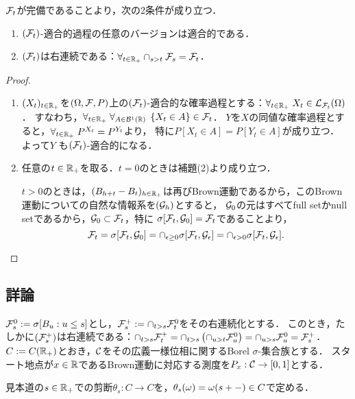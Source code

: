 \documentclass[uplatex,dvipdfmx]{jsreport}
\begin{document}
\begin{lemma}
    $\mathcal{F}_t$が完備であることより，次の2条件が成り立つ．
    \begin{enumerate}
        \item $(\mathcal{F}_t)$-適合的過程の任意のバージョンは適合的である．
        \item $(\mathcal{F}_t)$は右連続である：$\forall_{t\in\mathbb{R}_+}\cap_{s>t}\mathcal{F}_s=\mathcal{F}_t$．
    \end{enumerate}
\end{lemma}
\begin{proof}\mbox{}
    \begin{enumerate}
        \item $(X_t)_{t\in\mathbb{R}_+}$を$(\Omega,\mathcal{F},P)$上の$(\mathcal{F}_t)$-適合的な確率過程とする：$\forall_{t\in\mathbb{R}_+}\;X_t\in\mathcal{L}_{\mathcal{F}_t}(\Omega)$．
        すなわち，$\forall_{t\in\mathbb{R}_+}\;\forall_{A\in\mathcal{B}^1(\mathbb{R})}\;\left\{X_t\in A\right\}\in\mathcal{F}_t$．
        $Y$を$X$の同値な確率過程とすると，$\forall_{t\in\mathbb{R}_+}\;P^{X_t}=P^{Y_t}$より，
        特に$P[X_t\in A]=P[Y_t\in A]$が成り立つ．
        よって$Y$
        も$(\mathcal{F}_t)$-適合的になる．
        \item 
        任意の$t\in\mathbb{R}_+$を取る．$t=0$のときは補題(2)より成り立つ．

        $t>0$のときは，$(B_{h+t}-B_t)_{h\in\mathbb{R}_+}$は再びBrown運動であるから，このBrown運動についての自然な情報系を$(\mathcal{G}_h)$とすると，
        $\mathcal{G}_0$の元はすべてfull setかnull setであるから，$\mathcal{G}_0\subset\mathcal{F}_t$，特に
        $\sigma[\mathcal{F}_t,\mathcal{G}_0]=\mathcal{F}_t$であることより，
        \[\mathcal{F}_t=\sigma[\mathcal{F}_t,\mathcal{G}_0]=\cap_{\epsilon\ge0}\sigma[\mathcal{F}_t,\mathcal{G}_\epsilon]=\cap_{\epsilon>0}\sigma[\mathcal{F}_t,\mathcal{G}_\epsilon].\]
    \end{enumerate}
\end{proof}

\subsection{詳論}

\begin{notation}
    $\mathcal{F}^0_s:=\sigma[B_u:u\le s]$とし，$\mathcal{F}^+_s:=\cap_{t>s}\mathcal{F}^0_t$をその右連続化とする．
    このとき，たしかに$(\mathcal{F}^+_s)$は右連続である：$\cap_{t>s}\mathcal{F}_t^+=\cap_{t>s}\left(\cap_{u>t}\mathcal{F}^0_u\right)=\cap_{u>s}\mathcal{F}^0_u=\mathcal{F}_s^+$．
    $C:=C(\mathbb{R}_+)$とおき，$\mathcal{C}$をその広義一様位相に関するBorel $\sigma$-集合族とする．
    スタート地点が$x\in\mathbb{R}$であるBrown運動に対応する測度を$P_x:\mathcal{C}\to[0,1]$とする．
\end{notation}

\begin{definition}
    見本道の$s\in\mathbb{R}_+$での剪断$\theta_s:C\to C$を，$\theta_s(\omega)=\omega(s+-)\in C$で定める．
\end{definition}
\end{document}

